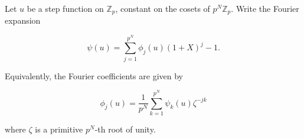 Let $u$ be a step function on $\mathbb{Z}_p$, constant on the cosets of $p^N \mathbb{Z}_p$. Write the Fourier expansion

$$\psi(u) = \sum_{j=1}^{p^N} \phi_j(u) (1 + X)^j - 1.$$

Equivalently, the Fourier coefficients are given by

$$\phi_j(u) = \frac{1}{p^N} \sum_{k=1}^{p^N} \psi_k(u) \zeta^{-jk}$$

where $\zeta$ is a primitive $p^N$-th root of unity.
